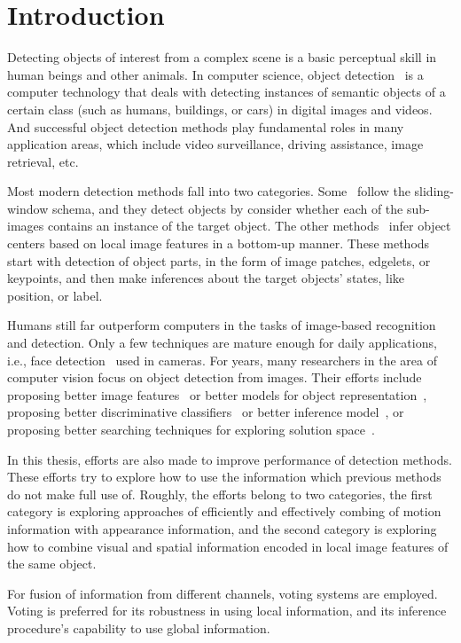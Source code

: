\chapter{Introduction}
Detecting objects of interest from a complex scene is a basic perceptual skill in human beings and other animals.
In computer science, object detection~\citep{dod} is a computer technology that deals with detecting instances of semantic objects of a certain class (such as humans, buildings, or cars) in digital images and videos. And successful object detection
methods play fundamental roles in many application areas, which include video surveillance, driving assistance, image retrieval, etc.

Most modern detection methods fall into two categories. Some~\citep{ij4,ac31,ac30,ac4,ac32,ac29,ac28,ac1} follow the sliding-window schema, and they detect objects by consider whether each of the sub-images contains an instance of the target object. The other methods~\citep{ac9,ac2,ac3,ac22,lb1,ac5,ac10,ac21,ac18} infer object centers based on local image features in a bottom-up manner. These methods start with detection of object parts, in the form of image patches, edgelets, or keypoints, and then make inferences about the target objects' states, like position, or label.


 Humans still far outperform computers in the tasks of image-based recognition and detection. Only a few techniques are mature enough for daily applications, i.e., face detection~\citep{face} used in cameras. For years, many researchers in the area of computer vision focus on object detection from images. Their efforts include proposing better image features~\citep{o17} or better models for object representation~\citep{bgf}, proposing better discriminative classifiers~\citep{dlearn} or better inference model~\citep{hdp}, or proposing better searching techniques for exploring solution space~\citep{bab}.

 In this thesis, efforts are also made to improve performance of detection methods. These efforts try to explore how to use the information which previous methods do not make full use of. Roughly, the efforts belong to two categories, the first category is exploring approaches of efficiently and effectively combing of motion information with appearance information, and the second category is exploring  how to combine visual and spatial information encoded in local image features of the same object.

For fusion of information from different channels, voting systems are employed. Voting is preferred  for its robustness in using local information, and its inference procedure's capability to use global information.

